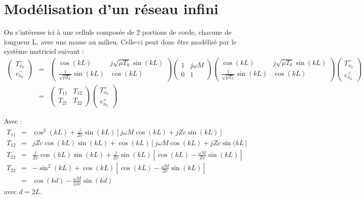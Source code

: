 \documentclass[a4paper,11pt]{report} %
\begin{document}
\section{Modélisation d'un réseau infini}
On s'intéresse ici à une cellule composée de 2 portions de corde, chacune de longueur L, avec une masse au milieu. Celle-ci peut donc être modélisé par le système matriciel suivant :
\begin{eqnarray*}
\begin{pmatrix} T_{x_0}^{-} \\ v_{x_0}^{-} \end{pmatrix} & = & \begin{pmatrix} \cos(k L) & j \sqrt{\mu T_0} \sin(k L) \\ \frac{1}{\sqrt{\mu T_0}} \sin(k L) & \cos(k L) \end{pmatrix} \begin{pmatrix} 1 & j \omega M \\ 0 & 1 \end{pmatrix}  \begin{pmatrix} \cos(k L) & j \sqrt{\mu T_0} \sin(k L) \\ \frac{1}{\sqrt{\mu T_0}} \sin(k L) & \cos(k L) \end{pmatrix} \begin{pmatrix} T_{x_0}^{+} \\ v_{x_0}^{+} \end{pmatrix} \\
& = & \begin{pmatrix} T_{11} & T_{12}\\ T_{21} & T_{22} \end{pmatrix} \begin{pmatrix} T_{x_0}^{+} \\ v_{x_0}^{+} \end{pmatrix}
\end{eqnarray*}

Avec :
\begin{eqnarray*}
T_{11} &  = & \cos^{2}(k L) + \frac{j}{Zc} \sin(k L)[j \omega M \cos(k L) + jZc \sin(k L)] \\
T_{12} &  = & j Zc \cos(k L)\sin(k L) + \cos(k L)[j \omega M \cos(k L) + j Zc \sin(k L] \\
T_{21} &  = & \frac{j}{Zc} \cos(k L) \sin(k L) + \frac{j}{Zc} \sin(k L)[\cos(k L) - \frac{\omega M}{Zc} \sin(k L)] \\
T_{22}  &=&  -\sin^{2}(k L) + \cos(k L)[\cos(k L) - \frac{\omega M}{Zc} \sin(k L)] \\ 
& = &  \cos(kd) - \frac{\omega M}{2 Zc}\sin(kd)
\end{eqnarray*}
avec $d = 2L$.
\end{document}
